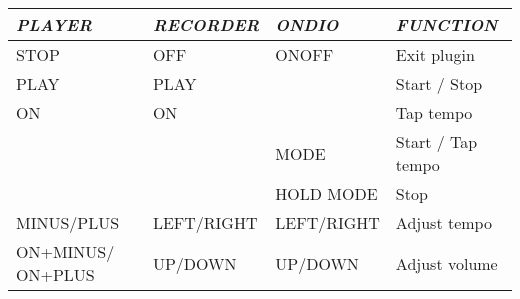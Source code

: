 \begin{tabular}[c]{|p{2.587cm}|p{2.55cm}|p{2.62cm}|p{4.952cm}|}
\hline
{\centering\bfseries\itshape
PLAYER 
\par}
&
{\centering\bfseries\itshape
RECORDER 
\par}
&
{\centering\bfseries\itshape
ONDIO 
\par}
&
{\centering\bfseries\itshape
FUNCTION 
\par}
\\\hline
{\centering
STOP 
\par}
&
{\centering
OFF 
\par}
&
{\centering
ONOFF 
\par}
&
Exit plugin 
\\\hline
{\centering
PLAY 
\par}
&
{\centering
PLAY 
\par}
&
{\centering
~ 
\par}
&
Start / Stop 
\\\hline
{\centering
ON 
\par}
&
{\centering
ON 
\par}
&
{\centering
~ 
\par}
&
Tap tempo 
\\\hline
{\centering
~ 
\par}
&
{\centering
~ 
\par}
&
{\centering
MODE 
\par}
&
Start / Tap tempo
\\\hline
{\centering
~ 
\par}
&
{\centering
~ 
\par}
&
{\centering
HOLD MODE 
\par}
&
Stop 
\\\hline
{\centering
MINUS/PLUS
\par}
&
{\centering
LEFT/RIGHT 
\par}
&
{\centering
LEFT/RIGHT 
\par}
&
Adjust tempo 
\\\hline
{\centering
ON+MINUS/\newline
ON+PLUS 
\par}
&
{\centering
UP/DOWN 
\par}
&
{\centering
UP/DOWN 
\par}
&
Adjust volume
\\\hline
\end{tabular}


